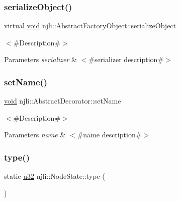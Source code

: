 \mbox{\label{classnjli_1_1_node_state_a4fc4bcd9d1930911474210c047372fc0}} 
\subsubsection{\texorpdfstring{serialize\+Object()}{serializeObject()}}
{\footnotesize\ttfamily virtual \mbox{\hyperlink{_thread_8h_af1e856da2e658414cb2456cb6f7ebc66}{void}} njli\+::\+Abstract\+Factory\+Object\+::serialize\+Object}

$<$\#\+Description\#$>$


\begin{DoxyParams}{Parameters}
{\em serializer} & $<$\#serializer description\#$>$ \\
\hline
\end{DoxyParams}
\mbox{\label{classnjli_1_1_node_state_a087eb5f8d9f51cc476f12f1d10a3cb95}} 
\subsubsection{\texorpdfstring{set\+Name()}{setName()}}
{\footnotesize\ttfamily \mbox{\hyperlink{_thread_8h_af1e856da2e658414cb2456cb6f7ebc66}{void}} njli\+::\+Abstract\+Decorator\+::set\+Name}

$<$\#\+Description\#$>$


\begin{DoxyParams}{Parameters}
{\em name} & $<$\#name description\#$>$ \\
\hline
\end{DoxyParams}
\mbox{\label{classnjli_1_1_node_state_ad73f8c965c1ad03441d1c1d07d6442b5}} 
\subsubsection{\texorpdfstring{type()}{type()}}
{\footnotesize\ttfamily static \mbox{\hyperlink{_util_8h_a10e94b422ef0c20dcdec20d31a1f5049}{u32}} njli\+::\+Node\+State\+::type (\begin{DoxyParamCaption}{ }\end{DoxyParamCaption})\hspace{0.3cm}{\ttfamily [static]}}

